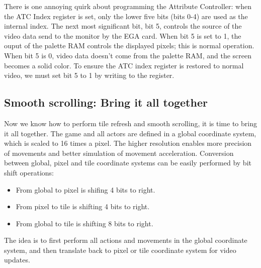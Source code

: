 \documentclass[book.tex]{subfiles}
\begin{document}
There is one annoying quirk about programming the Attribute Controller: when the ATC Index register is set, only the lower five bits (bits 0-4) are used as the internal index. The next most significant bit, bit 5, controls the source of the video data send to the monitor by the EGA card. When bit 5 is set to 1, the ouput of the palette RAM controls the displayed pixels; this is normal operation. When bit 5 is 0, video data doesn't come from the palette RAM, and the screen becomes a solid color. To ensure the ATC index register is restored to normal video, we must set bit 5 to 1 by writing  to the register.\\ 

\begin{minipage}{\textwidth}
  
  \end{minipage}
  \label{ega_pel_pan}
  \par

\subsection{Smooth scrolling: Bring it all together}
Now we know how to perform tile refresh and smooth scrolling, it is time to bring it all together. The game and all actors are defined in a global coordinate system, which is scaled to 16 times a pixel. The higher resolution enables more precision of movements and better simulation of movement acceleration. Conversion between global, pixel and tile coordinate systems can be easily performed by bit shift operations:
\begin{itemize}
\item From global to pixel is shifing 4 bits to right.
\item From pixel to tile is shifting 4 bits to right.
\item From global to tile is shifting 8 bits to right.
\end{itemize}

The idea is to first perform all actions and movements in the global coordinate system, and then translate back to pixel or tile coordinate system for video updates. \\
\begin{minipage}{\textwidth}
  
  \end{minipage}
  \label{ega_refresh}
  \par
\end{document}
